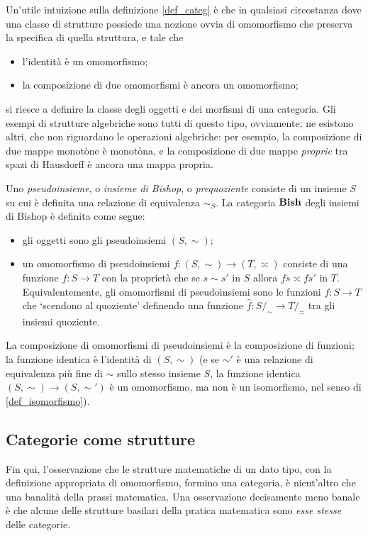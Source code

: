 Un'utile intuizione sulla definizione \ref{def_categ} è che in qualsiasi circostanza dove una classe di strutture possiede una nozione ovvia di omomorfismo che preserva la specifica di quella struttura, e tale che
\begin{itemize}
	\item l'identità è un omomorfismo;
	\item la composizione di due omomorfismi è ancora un omomorfismo;
\end{itemize}
si riesce a definire la classe degli oggetti e dei morfismi di una categoria. Gli esempi di strutture algebriche sono tutti di questo tipo, ovviamente; ne esistono altri, che non riguardano le operazioni algebriche: per esempio, la composizione di due mappe monotòne è monotòna, e la composizione di due mappe \emph{proprie} tra spazi di Hausdorff è ancora una mappa propria.
\begin{example}
	Uno \emph{pseudoinsieme}, o \emph{insieme di Bishop}, o \emph{prequoziente} consiste di un insieme $S$ su cui è definita una relazione di equivalenza $\sim_S$. La categoria $\mathbf{Bish}$ degli insiemi di Bishop è definita come segue: 
	\begin{itemize}
		\item gli oggetti sono gli pseudoinsiemi $(S,\sim)$;
		\item un omomorfismo di pseudoinsiemi $f : (S,\sim) \to (T,\asymp)$ consiste di una funzione $f : S\to T$ con la proprietà che se $s\sim s'$ in $S$ allora $fs\asymp fs'$ in $T$. Equivalentemente, gli omomorfismi di pseudoinsiemi sono le funzioni $f : S\to T$ che `scendono al quoziente' definendo una funzione $\hat f : S/_\sim \to T/_\asymp$ tra gli insiemi quoziente.
	\end{itemize}
	La composizione di omomorfismi di pseudoinsiemi è la composizione di funzioni; la funzione identica è l'identità di $(S,\sim)$ (e se $\sim'$ è una relazione di equivalenza più fine di $\sim$ sullo stesso insieme $S$, la funzione identica $(S,\sim) \to (S,\sim')$ è un omomorfismo, ma non è un isomorfismo, nel senso di \ref{def_isomorfismo}).
\end{example}
\begin{remark}
\end{remark}
\subsection{Categorie come strutture}\label{ssec:categorie_strutture}
Fin qui, l'osservazione che le strutture matematiche di un dato tipo, con la definizione appropriata di omomorfismo, formino una categoria, è nient'altro che una banalità della prassi matematica. Una osservazione decisamente meno banale è che alcune delle strutture basilari della pratica matematica sono \emph{esse stesse} delle categorie.

